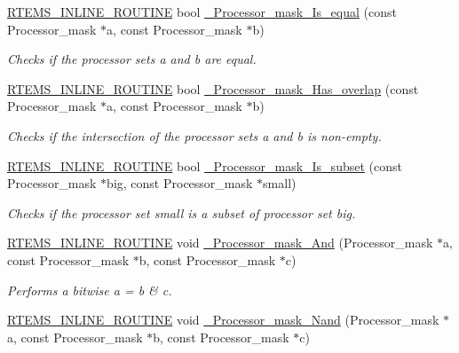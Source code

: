 \begin{DoxyCompactItemize}
\mbox{\hyperlink{group__RTEMSScoreBaseDefs_gac216239df231d5dbd15e3520b0b9313f}{R\+T\+E\+M\+S\+\_\+\+I\+N\+L\+I\+N\+E\+\_\+\+R\+O\+U\+T\+I\+NE}} bool \mbox{\hyperlink{group__RTEMSScoreProcessorMask_ga841c9df751a70cf2ee8a9f4842d259ff}{\+\_\+\+Processor\+\_\+mask\+\_\+\+Is\+\_\+equal}} (const Processor\+\_\+mask $\ast$a, const Processor\+\_\+mask $\ast$b)
\begin{DoxyCompactList}\small\item\em Checks if the processor sets a and b are equal. \end{DoxyCompactList}\item 
\mbox{\hyperlink{group__RTEMSScoreBaseDefs_gac216239df231d5dbd15e3520b0b9313f}{R\+T\+E\+M\+S\+\_\+\+I\+N\+L\+I\+N\+E\+\_\+\+R\+O\+U\+T\+I\+NE}} bool \mbox{\hyperlink{group__RTEMSScoreProcessorMask_ga92c586bbf7ec5bb594492f9c89f31aa5}{\+\_\+\+Processor\+\_\+mask\+\_\+\+Has\+\_\+overlap}} (const Processor\+\_\+mask $\ast$a, const Processor\+\_\+mask $\ast$b)
\begin{DoxyCompactList}\small\item\em Checks if the intersection of the processor sets a and b is non-\/empty. \end{DoxyCompactList}\item 
\mbox{\hyperlink{group__RTEMSScoreBaseDefs_gac216239df231d5dbd15e3520b0b9313f}{R\+T\+E\+M\+S\+\_\+\+I\+N\+L\+I\+N\+E\+\_\+\+R\+O\+U\+T\+I\+NE}} bool \mbox{\hyperlink{group__RTEMSScoreProcessorMask_ga4d831c7282fa105db97ce7c229a2e463}{\+\_\+\+Processor\+\_\+mask\+\_\+\+Is\+\_\+subset}} (const Processor\+\_\+mask $\ast$big, const Processor\+\_\+mask $\ast$small)
\begin{DoxyCompactList}\small\item\em Checks if the processor set small is a subset of processor set big. \end{DoxyCompactList}\item 
\mbox{\hyperlink{group__RTEMSScoreBaseDefs_gac216239df231d5dbd15e3520b0b9313f}{R\+T\+E\+M\+S\+\_\+\+I\+N\+L\+I\+N\+E\+\_\+\+R\+O\+U\+T\+I\+NE}} void \mbox{\hyperlink{group__RTEMSScoreProcessorMask_ga286f1a2dfff65e0fb5c259fd10e7cf33}{\+\_\+\+Processor\+\_\+mask\+\_\+\+And}} (Processor\+\_\+mask $\ast$a, const Processor\+\_\+mask $\ast$b, const Processor\+\_\+mask $\ast$c)
\begin{DoxyCompactList}\small\item\em Performs a bitwise a = b \& c. \end{DoxyCompactList}\item 
\mbox{\hyperlink{group__RTEMSScoreBaseDefs_gac216239df231d5dbd15e3520b0b9313f}{R\+T\+E\+M\+S\+\_\+\+I\+N\+L\+I\+N\+E\+\_\+\+R\+O\+U\+T\+I\+NE}} void \mbox{\hyperlink{group__RTEMSScoreProcessorMask_gada5a16b33a3105242d5ca976fba136d3}{\+\_\+\+Processor\+\_\+mask\+\_\+\+Nand}} (Processor\+\_\+mask $\ast$a, const Processor\+\_\+mask $\ast$b, const Processor\+\_\+mask $\ast$c)

\end{DoxyCompactItemize}
